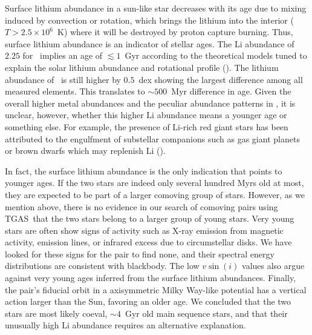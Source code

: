 \documentclass[modern, letterpaper]{aastex61}
\newcommand{\acronym}[1]{{\small{#1}}}
\newcommand{\tgas}{\acronym{TGAS}}
\newcommand*\elem[1]{\ensuremath{\mathrm{#1}}}
\newcommand{\sunanalog}{\text{Krios}}
\newcommand{\bizarreone}{\text{Kronos}}
\begin{document}
Surface lithium abundance in a sun-like star decreases with its age due to
mixing induced by convection or rotation, which brings the lithium into the
interior ($T>2.5 \times 10^{6}$~K) where it will be destroyed by proton capture
burning.
Thus, surface lithium abundance is an indicator of stellar ages.
The $\elem{Li}$ abundance of $2.25$ for \sunanalog\ implies an age of $\lesssim
1$~Gyr according to the theoretical models tuned to explain the solar lithium
abundance and rotational profile (\citealt{2005Sci...309.2189C}).
The lithium abundance of \bizarreone\ is still higher by $0.5$~dex showing the
largest difference among all measured elements.
This translates to $\sim 500$~Myr difference in age.
Given the overall higher metal abundances and the peculiar abundance patterns
in \bizarreone, it is unclear, however, whether this higher $\elem{Li}$
abundance means a younger age or something else.
For example, the presence of $\elem{Li}$-rich red giant stars has been
attributed to the engulfment of substellar companions such as gas giant planets
or brown dwarfs which may replenish $\elem{Li}$ (\citealt{Casey:2016aa}).

In fact, the surface lithium abundance is the only indication that points to younger ages.
If the two stars are indeed only several hundred Myrs old at most,
they are expected to be part of a larger comoving group of stars.
However, as we mention above, there is no evidence in our search of comoving pairs
using \tgas\ that the two stars belong to a larger group of young stars.
Very young stars are often show signs of activity such as
X-ray emission from magnetic activity, emission lines, or infrared excess due to
circumstellar disks.
We have looked for these signs for the pair to find none, and their spectral energy
distributions are consistent with blackbody.
The low $v\sin(i)$ values also argue against very young ages inferred from the
surface lithium abundances.
Finally, the pair's fiducial orbit in a axisymmetric Milky Way-like potential
has a vertical action larger than the Sun, favoring an older age.
We concluded that the two stars are most likely coeval, $\sim 4$~Gyr old main
sequence stars, and that their unusually high \elem{Li} abundance requires an
alternative explanation.
\end{document}
